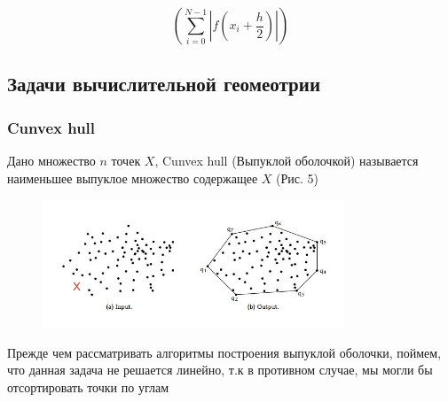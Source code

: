 \[
    \left( \sum_{i=0}^{N - 1} \left| f(x_i + \dfrac{h}{2}) \right| \right)
\]

\subsection{Задачи вычислительной геомеотрии}
\subsubsection{Cunvex hull}
Дано множество $n$ точек $X$, Cunvex hull (Выпуклой оболочкой) называется наименьшее выпуклое множество содержащее $X$ (Рис. 5)

\begin{figure}[H]
    \centering
    \includegraphics[width = 9cm]{Convex_hull.jpeg}
    \caption{}
    \label{fig:float}
\end{figure}

Прежде чем рассматривать алгоритмы построения выпуклой оболочки, поймем, что данная задача не решается линейно, т.к в противном случае, мы могли бы отсортировать точки по углам

